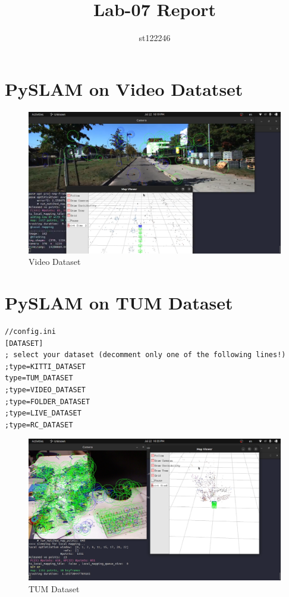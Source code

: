 \documentclass[a4paper, 12pt]{article}
\title{Lab-07 Report}
\author{st122246}
\begin{document}
	\maketitle

	\section{PySLAM on Video Datatset}
	
	\begin{figure}
		\caption{Video Dataset}
		\includegraphics[scale=0.25]{images/video.png}
	\end{figure}

\section{PySLAM on TUM Dataset}

	\begin{lstlisting}
//config.ini
[DATASET]
; select your dataset (decomment only one of the following lines!) 
;type=KITTI_DATASET
type=TUM_DATASET
;type=VIDEO_DATASET
;type=FOLDER_DATASET
;type=LIVE_DATASET
;type=RC_DATASET
	\end{lstlisting}
	
	\begin{figure}
		\caption{TUM Dataset}
		\includegraphics[scale=0.25]{images/TUM.png}
	\end{figure}
\end{document}
